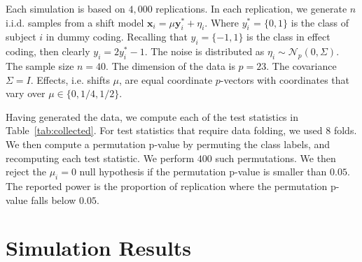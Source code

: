 \documentclass[12pt,a4paper]{article}
\newcommand{\set}[1]{\{ #1 \}} %
\newcommand{\rv}[1]{\mathbf{#1}} %
\newcommand{\x}{\rv x} %
\newcommand{\y}{\rv y} %
\newcommand{\gaussp}[2]{\mathcal{N}_{#1}\left(#2\right)} %
\begin{document}
Each simulation is based on $4,000$ replications. 
In each replication, we generate $n$ i.i.d. samples from a shift model $\x_i = \mu \y^*_i + \eta_i$.
Where $y^*_i=\set{0,1}$ is the class of subject $i$ in dummy coding. 
Recalling that $y_i=\set{-1,1}$ is the class in effect coding, then clearly $y_i=2 y^*_i-1$.
The noise is distributed as $\eta_i \sim \gaussp{p}{0,\Sigma}$. 
The sample size $n=40$. 
The dimension of the data is $p=23$. 
The covariance $\Sigma=I$. 
Effects, i.e. shifts $\mu$, are equal coordinate $p$-vectors with coordinates that vary over $\mu \in \set{0,1/4,1/2}$.

Having generated the data, we compute each of the test statistics in Table~\ref{tab:collected}.
For test statistics that require data folding, we used $8$ folds. 
We then compute a permutation p-value by permuting the class labels, and recomputing each test statistic. 
We perform $400$ such permutations. 
We then reject the $\mu_i=0$ null hypothesis if the permutation p-value is smaller than $0.05$.
The reported power is the proportion of replication where the permutation p-value falls below $0.05$.




\newpage

\section{Simulation Results}
\label{apx:simulations}
\end{document}
